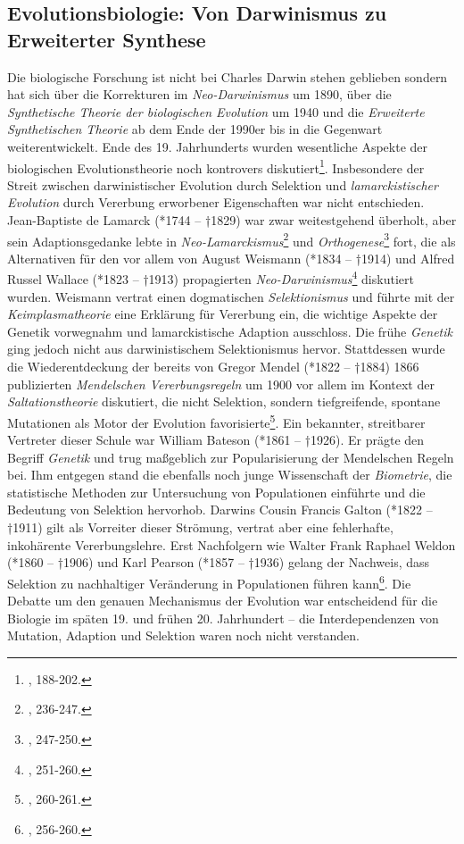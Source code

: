 \documentclass[openany,twoside,twocolumn]{book}
\let\rmarkdownfootnote\footnote%
\def\footnote{\protect\rmarkdownfootnote}
\begin{document}
\hypertarget{biology}{%
\subsection{Evolutionsbiologie: Von Darwinismus zu Erweiterter
Synthese}\label{biology}}

Die biologische Forschung ist nicht bei Charles Darwin stehen geblieben
sondern hat sich über die Korrekturen im \emph{Neo-Darwinismus} um 1890,
über die \emph{Synthetische Theorie der biologischen Evolution} um 1940
und die \emph{Erweiterte Synthetischen Theorie} ab dem Ende der 1990er
bis in die Gegenwart weiterentwickelt. Ende des 19. Jahrhunderts wurden
wesentliche Aspekte der biologischen Evolutionstheorie noch kontrovers
diskutiert\footnote{\textcite{bowler_evolution_1989}, 188-202.}.
Insbesondere der Streit zwischen darwinistischer Evolution durch
Selektion und \emph{lamarckistischer Evolution} durch Vererbung
erworbener Eigenschaften war nicht entschieden. Jean-Baptiste de Lamarck
(*1744 -- †1829) war zwar weitestgehend überholt, aber sein
Adaptionsgedanke lebte in \emph{Neo-Lamarckismus}\footnote{\textcite{bowler_evolution_1989},
  236-247.} und \emph{Orthogenese}\footnote{\textcite{bowler_evolution_1989},
  247-250.} fort, die als Alternativen für den vor allem von August
Weismann (*1834 -- †1914) und Alfred Russel Wallace (*1823 -- †1913)
propagierten \emph{Neo-Darwinismus}\footnote{\textcite{bowler_evolution_1989},
  251-260.} diskutiert wurden. Weismann vertrat einen dogmatischen
\emph{Selektionismus} und führte mit der \emph{Keimplasmatheorie} eine
Erklärung für Vererbung ein, die wichtige Aspekte der Genetik vorwegnahm
und lamarckistische Adaption ausschloss. Die frühe \emph{Genetik} ging
jedoch nicht aus darwinistischem Selektionismus hervor. Stattdessen
wurde die Wiederentdeckung der bereits von Gregor Mendel (*1822 --
†1884) 1866 publizierten \emph{Mendelschen Vererbungsregeln} um 1900 vor
allem im Kontext der \emph{Saltationstheorie} diskutiert, die nicht
Selektion, sondern tiefgreifende, spontane Mutationen als Motor der
Evolution favorisierte\footnote{\textcite{bowler_evolution_1989},
  260-261.}. Ein bekannter, streitbarer Vertreter dieser Schule war
William Bateson (*1861 -- †1926). Er prägte den Begriff \emph{Genetik}
und trug maßgeblich zur Popularisierung der Mendelschen Regeln bei. Ihm
entgegen stand die ebenfalls noch junge Wissenschaft der
\emph{Biometrie}, die statistische Methoden zur Untersuchung von
Populationen einführte und die Bedeutung von Selektion hervorhob.
Darwins Cousin Francis Galton (*1822 -- †1911) gilt als Vorreiter dieser
Strömung, vertrat aber eine fehlerhafte, inkohärente Vererbungslehre.
Erst Nachfolgern wie Walter Frank Raphael Weldon (*1860 -- †1906) und
Karl Pearson (*1857 -- †1936) gelang der Nachweis, dass Selektion zu
nachhaltiger Veränderung in Populationen führen kann\footnote{\textcite{bowler_evolution_1989},
  256-260.}. Die Debatte um den genauen Mechanismus der Evolution war
entscheidend für die Biologie im späten 19. und frühen 20. Jahrhundert
-- die Interdependenzen von Mutation, Adaption und Selektion waren noch
nicht verstanden.
\end{document}
